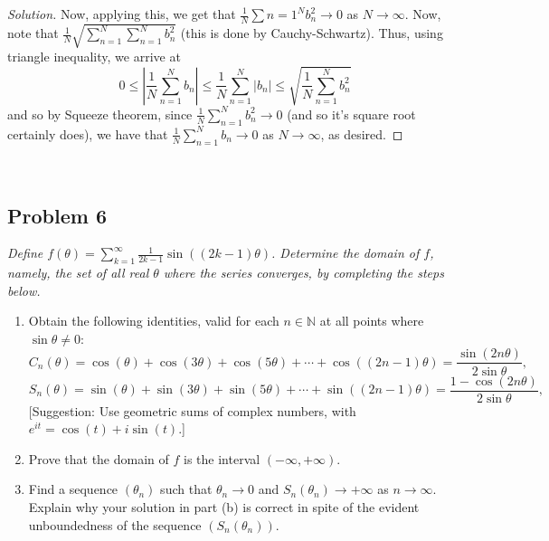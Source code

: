 \documentclass{article}
\newcommand{\N}{{\mathbb N}}
\begin{document}
{{\begin{enumerate}
\begin{proof}[Solution]
		Now, applying this, we get that $\frac{1}{N}\sum{n=1}^N b_n^2 \to 0$
		as $N \to \infty$.
		Now, note that $\frac{1}{N}\sqrt{\sum_{n=1}^N \sum_{n=1}^N b_n^2}$
		(this is done by Cauchy-Schwartz).
		Thus, using triangle inequality, we arrive at
		\[
			0 \leq \left\lvert \frac{1}{N}\sum_{n=1}^N b_n\right\rvert
			\leq \frac{1}{N} \sum_{n=1}^N |b_n|
			\leq \sqrt{\frac{1}{N}\sum_{n=1}^N b_n^2}
		\]
		and so by Squeeze theorem,
		since $\frac{1}{N}\sum^N_{n=1}b_n^2 \to 0$
		(and so it's square root certainly does),
		we have that $\frac{1}{N}\sum_{n=1}^N b_n \to 0$
		as $N \to \infty$, as desired.
	\end{proof}
\end{enumerate} 
\clearpage
~\clearpage

\subsection*{Problem 6}
{\it Define $f(\theta) = \sum_{k=1}^\infty \frac{1}{2k-1}\sin((2k-1)\theta)$.
Determine the domain of $f$, namely,
the set of all real $\theta$ where the series converges,
by completing the steps below.
\begin{enumerate}
	\item Obtain the following identities, valid for each $n \in \N$
		at all points where $\sin\theta \neq 0$:
		\[
			C_n(\theta) = \cos(\theta) + \cos(3\theta) + \cos(5\theta)
			+ \cdots + \cos((2n-1)\theta) = \frac{\sin(2n\theta)}{2\sin\theta},
		\]
		\[
			S_n(\theta) = \sin(\theta) + \sin(3\theta) + \sin(5\theta)
			+ \cdots + \sin((2n-1)\theta) = \frac{1-\cos(2n\theta)}{2\sin\theta},
		\]
		[Suggestion: Use geometric sums of complex numbers,
		with $e^{it} = \cos(t) + i\sin(t)$.]
	\item Prove that the domain of $f$ is the interval $(-\infty,+\infty)$.
	\item Find a sequence $(\theta_n)$ such that $\theta_n \to 0$
		and $S_n(\theta_n) \to +\infty$ as $n \to \infty$.
		Explain why your solution in part (b) is correct in spite
		of the evident unboundedness of the sequence $(S_n(\theta_n))$.
\end{enumerate}
}

}}
\end{document}
